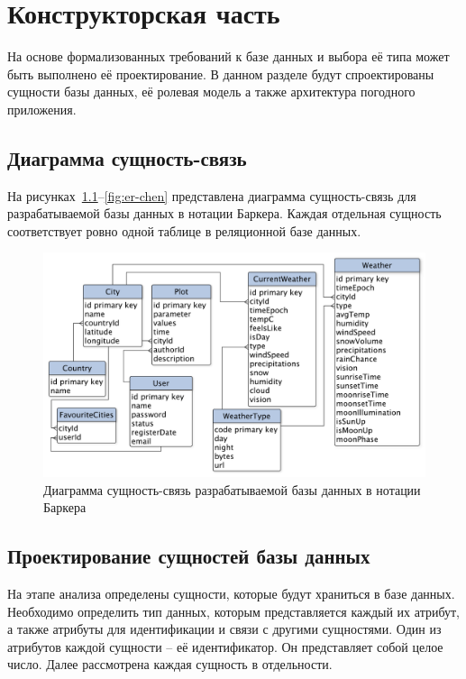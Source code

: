 \chapter{Конструкторская часть}

На основе формализованных требований к базе данных и выбора её типа может быть выполнено её проектирование.
В данном разделе будут спроектированы сущности базы данных, её ролевая модель а также архитектура погодного приложения.

\section{Диаграмма сущность-связь}
На рисунках~\ref{fig:er-barker}--\ref{fig:er-chen} представлена диаграмма сущность-связь для разрабатываемой базы данных в нотации Баркера.
Каждая отдельная сущность соответствует ровно одной таблице в реляционной базе данных.
\begin{figure}[H]
	\centering
	\includegraphics[width=\textwidth]{tools/img/er-barker.pdf}
	\caption{
        Диаграмма сущность-связь разрабатываемой базы данных в нотации Баркера
    }
	\label{fig:er-barker}
\end{figure}

\section{Проектирование сущностей базы данных}

На этапе анализа определены сущности, которые будут храниться в базе данных.
Необходимо определить тип данных, которым представляется каждый их атрибут, а также атрибуты для идентификации и связи с другими сущностями.
Один из атрибутов каждой сущности -- её идентификатор.
Он представляет собой целое число.
Далее рассмотрена каждая сущность в отдельности.

